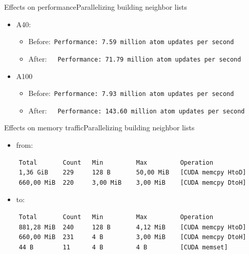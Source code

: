 \documentclass[ignorenonframetext,aspectratio=169]{beamer}
\providecommand{\tightlist}{%
  \setlength{\itemsep}{0pt}\setlength{\parskip}{0pt}}
\begin{document}
\begin{frame}{Effects on performance}{Parallelizing building neighbor lists}
    \begin{itemize}
        \tightlist
        \item
        A40:
        
        \begin{itemize}
            \tightlist
            \item
            Before:~\texttt{Performance:\ 7.59\ million\ atom\ updates\ per\ second}
            \item
            After:~~~\texttt{Performance:\ 71.79\ million\ atom\ updates\ per\ second}
        \end{itemize}
        \item
        A100
        
        \begin{itemize}
            \tightlist
            \item
            Before:~\texttt{Performance:\ 7.93\ million\ atom\ updates\ per\ second}
            \item
            After:~~~\texttt{Performance:\ 143.60\ million\ atom\ updates\ per\ second}
        \end{itemize}
    \end{itemize}

    
    
    

\end{frame}

\begin{frame}[fragile]{Effects on memory traffic}{Parallelizing building neighbor lists}
    
    \begin{itemize}
        \item from:
    \end{itemize}
    \begin{verbatim}
    Total       Count   Min         Max         Operation
    1,36 GiB    229     128 B       50,00 MiB   [CUDA memcpy HtoD]
    660,00 MiB  220     3,00 MiB    3,00 MiB    [CUDA memcpy DtoH]
    \end{verbatim}

    \begin{itemize}
    \item to:
    \end{itemize}    
    
    
    \begin{verbatim}
    Total       Count   Min         Max         Operation
    881,28 MiB  240     128 B       4,12 MiB    [CUDA memcpy HtoD]
    660,00 MiB  231     4 B         3,00 MiB    [CUDA memcpy DtoH]
    44 B        11      4 B         4 B         [CUDA memset]
    \end{verbatim}
    
\end{frame}
\end{document}
